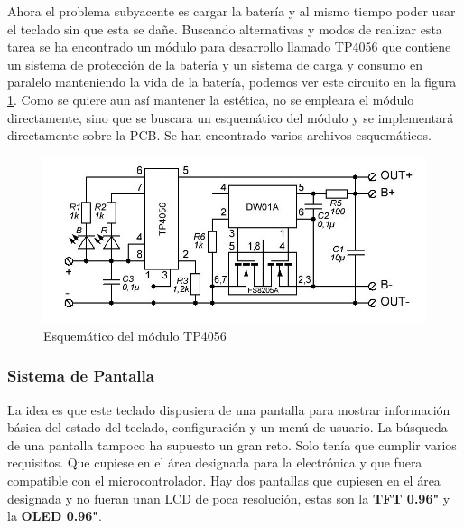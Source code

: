 Ahora el problema subyacente es cargar la batería y al mismo tiempo poder usar el teclado sin que esta se dañe. Buscando alternativas y modos de realizar esta tarea se ha encontrado un módulo para desarrollo llamado TP4056 que contiene un sistema de protección de la batería y un sistema de carga y consumo en paralelo manteniendo la vida de la batería, podemos ver este circuito en la figura \ref{fig:SchemeTP4056}. Como se quiere aun así mantener la estética, no se empleara el módulo directamente, sino que se buscara un esquemático del módulo y se implementará directamente sobre la \gls{PCB}. Se han encontrado varios archivos esquemáticos.

\begin{figure}[H]
    \centering
    \includegraphics[width=1\textwidth]{imagenes/Capitulos/Cap03/TP4056Schematic.png}
    \caption{Esquemático del módulo TP4056 \cite{TP4056SchematicInternet}}
    \label{fig:SchemeTP4056}
\end{figure}

\subsubsection{Sistema de Pantalla} \label{DiseñoPantalla}
La idea es que este teclado dispusiera de una pantalla para mostrar información básica del estado del teclado, configuración y un menú de usuario. La búsqueda de una pantalla tampoco ha supuesto un gran reto. Solo tenía que cumplir varios requisitos. Que cupiese en el área designada para la electrónica y que fuera compatible con el microcontrolador. Hay dos pantallas que cupiesen en el área designada y no fueran unan \gls{LCD} de poca resolución, estas son la \textbf{\gls{TFT} 0.96"} y la \textbf{\gls{OLED} 0.96"}.

